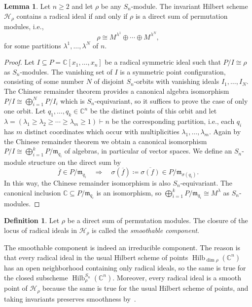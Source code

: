 \documentclass[11pt]{amsart}
\theoremstyle{definition}
\newtheorem{lemma}[theorem]{Lemma}
\newtheorem{definition}[theorem]{Definition}
\newcommand{\CC}{\mathbb{C}}
\newcommand{\mm}{\mathfrak{m}}
\newcommand{\HH}{\mathcal{H}}
\DeclareMathOperator{\Hilb}{Hilb}
\begin{document}
\begin{lemma}\label{lemma:radicalIdeals}
    Let $n \geq 2$ and let $\rho$ be any $S_n$-module. The invariant Hilbert scheme $\mathcal{H}_\rho$ contains a radical ideal if and only if $\rho$ is a direct sum of permutation modules, i.e.,
    \begin{equation*}
        \rho \cong M^{\lambda^1} \oplus \cdots \oplus M^{\lambda^N},
    \end{equation*}
    for some partitions $\lambda^1, \ldots, \lambda^N$ of $n$.
\end{lemma}

\begin{proof}
    Let $I \subseteq P = \CC[x_1,\ldots,x_n]$ be a radical symmetric ideal such that $P/I \cong \rho$ as $S_n$-modules. The vanishing set of $I$ is a symmetric point configuration, consisting of some number $N$ of disjoint $S_n$-orbits with vanishing ideals $I_1, \ldots, I_N$. The Chinese remainder theorem provides a canonical algebra isomorphism $P/I \cong \bigoplus_{i=1}^N P/I_i$ which is $S_n$-equivariant, so it suffices to prove the case of only one orbit. Let $q_1, \ldots, q_k \in \CC^n$ be the distinct points of this orbit and let $\lambda = (\lambda_1 \geq \lambda_2 \geq \cdots \geq \lambda_m \geq 1) \vdash n$ be the corresponding partition, i.e., each $q_i$ has $m$ distinct coordinates which occur with multiplicities $\lambda_1, \ldots, \lambda_m$. Again by the Chinese remainder theorem we obtain a canonical isomorphism $P/I \cong \bigoplus_{i=1}^k P/\mm_{q_i}$ of algebras, in particular of vector spaces. We define an $S_n$-module structure on the direct sum by
    \begin{equation*}
        \overline{f} \in P/\mm_{q_i} \quad \Rightarrow \quad \sigma(\overline{f}) \coloneqq \overline{\sigma(f)} \in P/\mm_{\sigma(q_i)}.
    \end{equation*}
    In this way, the Chinese remainder isomorphism is also $S_n$-equivariant. The canonical inclusion $\CC \subseteq P/\mm_{q_i}$ is an isomorphism, so $\bigoplus_{i=1}^k P/\mm_{q_i} \cong M^\lambda$ as $S_n$-modules.
\end{proof}

\begin{definition}
    Let $\rho$ be a direct sum of permutation modules. The closure of the locus of radical ideals in $\HH_\rho$ is called the \emph{smoothable component}.
\end{definition}

The smoothable component is indeed an irreducible component. The reason is that every radical ideal in the usual Hilbert scheme of points $\Hilb_{\dim \rho}(\CC^n)$ has an open neighborhood containing only radical ideals, so the same is true for the closed subscheme $\Hilb_\rho^{S_n}(\CC^n)$. Moreover, every radical ideal is a smooth point of $\HH_\rho$ because the same is true for the usual Hilbert scheme of points, and taking invariants preserves smoothness by~\cite[Theorem~5.2]{Fogarty1973Fixed}.
\end{document}
